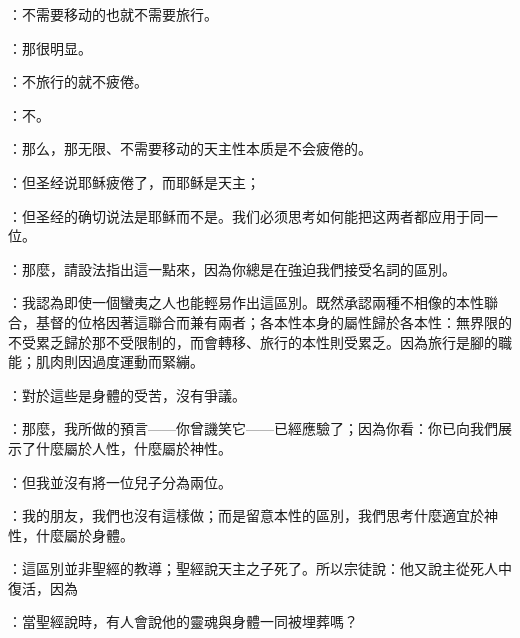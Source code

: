 ：不需要移动的也就不需要旅行。\par

：那很明显。\par

：不旅行的就不疲倦。\par

：不。\par

：那么，那无限、不需要移动的天主性本质是不会疲倦的。\par

：但圣经说耶稣疲倦了，而耶稣是天主；\par

：但圣经的确切说法是耶稣而不是。我们必须思考如何能把这两者都应用于同一位。\par

：那麼，請設法指出這一點來，因為你總是在強迫我們接受名詞的區別。\par

：我認為即使一個蠻夷之人也能輕易作出這區別。既然承認兩種不相像的本性聯合，基督的位格因著這聯合而兼有兩者；各本性本身的屬性歸於各本性：無界限的不受累乏歸於那不受限制的，而會轉移、旅行的本性則受累乏。因為旅行是腳的職能；肌肉則因過度運動而緊繃。\par

：對於這些是身體的受苦，沒有爭議。\par

：那麼，我所做的預言——你曾譏笑它——已經應驗了；因為你看：你已向我們展示了什麼屬於人性，什麼屬於神性。\par

：但我並沒有將一位兒子分為兩位。\par

：我的朋友，我們也沒有這樣做；而是留意本性的區別，我們思考什麼適宜於神性，什麼屬於身體。\par

：這區別並非聖經的教導；聖經說天主之子死了。所以宗徒說：\newline{}他又說主從死人中復活，因為\par

：當聖經說時，有人會說他的靈魂與身體一同被埋葬嗎？\par


